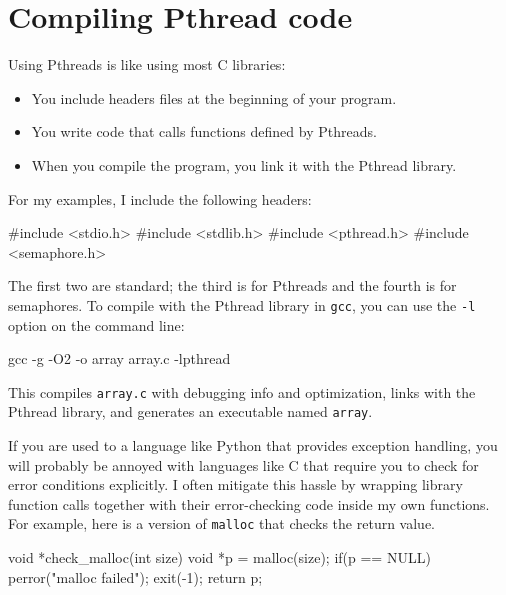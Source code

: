 \documentclass{book}
\begin{document}
\section{Compiling Pthread code}

Using Pthreads is like using most C libraries:

\begin{itemize}

    \item You include headers files at the beginning of your
          program.

    \item You write code that calls functions defined by Pthreads.

    \item When you compile the program, you link it with the
          Pthread library.

\end{itemize}

For my examples, I include the following headers:

\begin{unbreakable}[title={Headers}]{}
#include <stdio.h>
#include <stdlib.h>
#include <pthread.h>
#include <semaphore.h>
\end{unbreakable}

The first two are standard; the third is for Pthreads and
the fourth is for semaphores.
To compile with the Pthread library in {\tt gcc}, you
can use the {\tt -l}
option on the command line:

\begin{unbreakable}[title={}]{}
gcc -g -O2 -o array array.c -lpthread
\end{unbreakable}

This compiles {\tt array.c} with debugging info and optimization,
links with the Pthread library, and generates an executable
named {\tt array}.

If you are used to a language like Python that provides exception
handling, you will probably be annoyed with languages like C that
require you to check for error conditions explicitly.  I often
mitigate this hassle by wrapping library function calls
together with their error-checking code inside my own functions.
For example, here is a version of {\tt malloc}
that checks the return value.

\begin{unbreakable}[title={}]{}
void *check_malloc(int size) {
  void *p = malloc(size);
  if(p == NULL) {
    perror("malloc failed");
    exit(-1);
  }
  return p;
}
\end{unbreakable}
\end{document}
